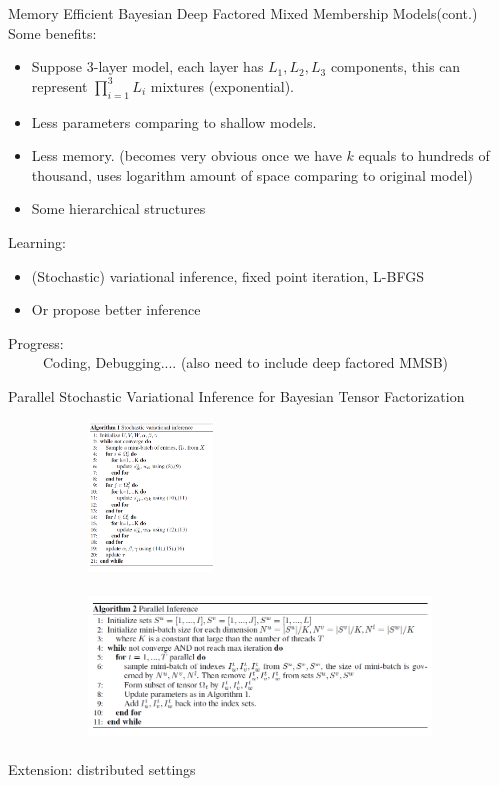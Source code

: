 \documentclass[mathserif, handout]{beamer}
\begin{document}
\begin{frame}{Memory Efficient Bayesian Deep Factored Mixed Membership Models(cont.)}
Some benefits:
\begin{itemize}
\item Suppose 3-layer model, each layer has $L_1,L_2,L_3$ components, this can represent $\prod_{i=1}^{3}L_i$ mixtures (exponential).
\item Less parameters comparing to shallow models.
\item Less memory. (becomes very obvious once we have $k$ equals to hundreds of thousand, uses logarithm amount of space comparing to original model)
\item Some hierarchical structures
\end{itemize}

Learning:
\begin{itemize}
\item (Stochastic) variational inference, fixed point iteration, L-BFGS
\item Or propose better inference
\end{itemize}
Progress:\\
~~~~~Coding, Debugging.... (also need to include deep factored MMSB)
\end{frame}


\begin{frame}{Parallel Stochastic Variational Inference for Bayesian
Tensor Factorization}

\begin{figure}
  \begin{subfigure}[b]{.3\linewidth}
    \includegraphics[height=4cm]{svi.png}
  \end{subfigure}
  \begin{subfigure}[b]{.65\linewidth}
    \includegraphics[height=4cm]{svi2.png}
  \end{subfigure}
\end{figure}
Extension: distributed settings
\end{frame}
\end{document}
